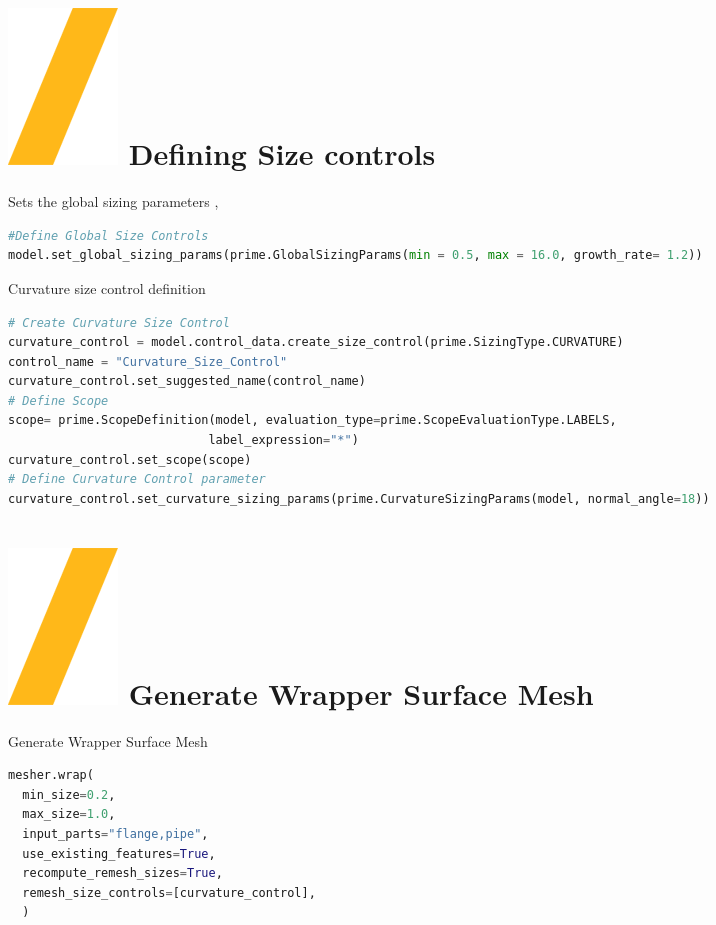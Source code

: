 \documentclass[9pt,landscape]{article}
\begin{document}
\begin{multicols}{3}
\section{\includegraphics[height=\fontcharht\font`\S]{slash.png} Defining Size controls }
Sets the global sizing parameters , 

\begin{lstlisting}[language=Python]
#Define Global Size Controls
model.set_global_sizing_params(prime.GlobalSizingParams(min = 0.5, max = 16.0, growth_rate= 1.2))
\end{lstlisting}

Curvature size control definition
\begin{lstlisting}[language=Python]
# Create Curvature Size Control
curvature_control = model.control_data.create_size_control(prime.SizingType.CURVATURE)
control_name = "Curvature_Size_Control"
curvature_control.set_suggested_name(control_name)
# Define Scope 
scope= prime.ScopeDefinition(model, evaluation_type=prime.ScopeEvaluationType.LABELS,
                            label_expression="*")
curvature_control.set_scope(scope)
# Define Curvature Control parameter
curvature_control.set_curvature_sizing_params(prime.CurvatureSizingParams(model, normal_angle=18))
\end{lstlisting}
\section{\includegraphics[height=\fontcharht\font`\S]{slash.png} Generate Wrapper Surface Mesh}
Generate Wrapper Surface Mesh
\begin{lstlisting}[language=Python]
mesher.wrap(
  min_size=0.2,
  max_size=1.0,
  input_parts="flange,pipe",
  use_existing_features=True,
  recompute_remesh_sizes=True,
  remesh_size_controls=[curvature_control],
  )
\end{lstlisting}


\end{multicols}
\end{document}
